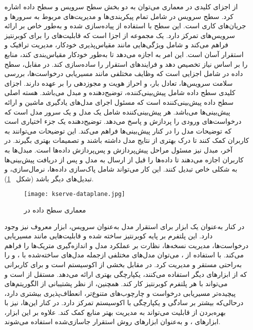 از اجزای کلیدی در معماری  می‌توان به دو بخش سطح سرویس و سطح داده اشاره کرد. سطح سرویس در  شامل تمام پیکربندی‌ها و مدیریت‌های مربوط به سرورها و جریان‌های کاری است. این سطح با استفاده از  پیاده‌سازی شده و به‌طور خاص بر ارائه سرویس‌های  تمرکز دارد.  یک مجموعه از اجزا است که قابلیت‌های  را برای کوبرنتیز فراهم می‌کند و شامل ویژگی‌هایی مانند مقیاس‌پذیری خودکار، مدیریت ترافیک و استقرار آسان است. این امر به  اجازه می‌دهد تا به‌طور خودکار مقیاس‌بندی کند، منابع را بر اساس نیاز تخصیص دهد و فرایندهای استقرار را ساده‌سازی کند. در مقابل، سطح داده در  شامل اجزایی است که وظایف مختلفی مانند مسیریابی درخواست‌ها، بررسی سلامت سرویس‌ها، تعادل بار، و احراز هویت و مجوزدهی را بر عهده دارند. اجزای کلیدی سطح داده شامل پیش‌بینی‌کننده،‌ توضیح‌دهنده و مبدل می‌باشد. هسته اصلی سطح داده پیش‌بینی‌کننده است که مسئول اجرای مدل‌های یادگیری ماشین و ارائه پیش‌بینی‌ها می‌باشد. هر پیش‌بینی‌کننده شامل یک مدل و یک سرور مدل است که درخواست‌های ورودی را پردازش و پاسخ می‌دهد. توضیح‌دهنده یک جزء اختیاری است که توضیحات مدل را در کنار پیش‌بینی‌ها فراهم می‌کند. این توضیحات می‌توانند به کاربران کمک کنند تا درک بهتری از نتایج مدل داشته باشند و تصمیمات بهتری بگیرند. در آخر،‌ مبدل نیز مسئول مراحل پیش‌پردازش و پس‌پردازش داده‌ها است. مبدل‌ها به کاربران اجازه می‌دهند تا داده‌ها را قبل از ارسال به مدل و پس از دریافت پیش‌بینی‌ها به شکلی خاص تبدیل کنند. این کار می‌تواند شامل پاک‌سازی داده‌ها، نرمال‌سازی، و تبدیل‌های دیگر باشد \cite{KServe} (شکل ~\ref{fig: kserve dataplane}).

\begin{figure}[!t]
	\centering
	\texttt{[image: kserve-dataplane.jpg]}
	\caption{معماری سطح داده در }
	\label{fig: kserve dataplane}
\end{figure} 

در کنار  به‌عنوان یک ابزار برای استقرار مدل به‌عنوان سرویس،‌ ابزار معروف  نیز وجود دارد. این پلتفرم بر پایه کوبرنتیز ساخته شده و قابلیت‌هایی مانند مسیریابی درخواست‌ها، مدیریت نسخه‌ها، نظارت بر عملکرد مدل و اندازه‌گیری متریک‌ها را فراهم می‌کند. با استفاده از ، می‌توان مدل‌های مختلفی ازجمله مدل‌های ساخته‌شده با ،  و  را به‌راحتی مستقر و مدیریت کرد. در مقابل  بخشی از اکوسیستم  است و برای کاربرانی که از ابزارهای دیگر  استفاده می‌کنند، یکپارچگی بهتری ارائه می‌دهد.  مستقل از  است و می‌تواند با هر پلتفرم کوبرنتیز کار کند. همچنین،  از نظر پشتیبانی از الگوریتم‌های پیچیده‌تر مسیریابی درخواست و چارچوب‌های متنوع‌تر، انعطاف‌پذیری بیشتری دارد، درحالی‌که  بیشتر بر سادگی و یکپارچگی با اکوسیستم  تمرکز دارد. در کنار این‌ها،  نیز با بهره‌بردن از قابلیت  می‌تواند به مدیریت بهتر منابع کمک کند. علاوه بر این ابزار، ابزارهای ،  و  به‌عنوان ابزارهای روش استقرار جاسازی‌شده استفاده می‌شوند.

